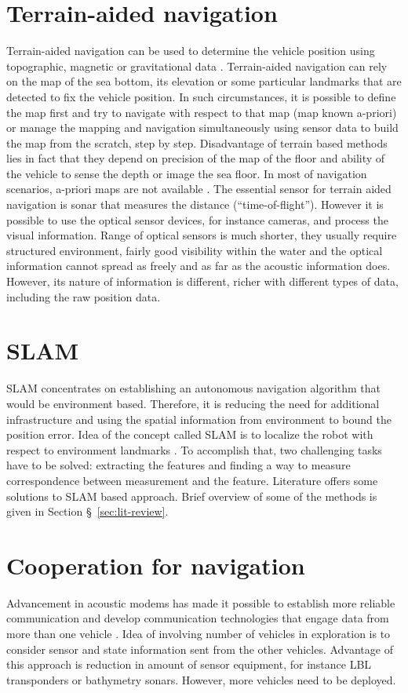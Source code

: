 \section{Terrain-aided navigation} \label{sec:terrain-aided}
Terrain-aided navigation can be used to determine the vehicle position using topographic, magnetic or gravitational data \cite{kinsey06}. Terrain-aided navigation can rely on the map of the sea bottom, its elevation or some particular landmarks that are detected to fix the vehicle position. In such circumstances, it is possible to define the map first and try to navigate with respect to that map (map known a-priori) or manage the mapping and navigation simultaneously using sensor data to build the map from the scratch, step by step. Disadvantage of terrain based methods lies in fact that they depend on precision of the map of the floor and ability of the vehicle to sense the depth or image the sea floor. In most of navigation scenarios, a-priori maps are not available \cite{kinsey06}.
The essential sensor for terrain aided navigation is sonar that measures the distance (``time-of-flight''). However it is possible to use the optical sensor devices, for instance cameras, and process the visual information. Range of optical sensors is much shorter, they usually require structured environment, fairly good visibility within the water and the optical information cannot spread as freely and as far as the acoustic information does. However, its nature of information is different, richer with different types of data, including the raw position data. 
\section{SLAM} \label{sec:slam}
SLAM concentrates on establishing an autonomous navigation algorithm that would be environment based. Therefore, it is reducing the need for additional infrastructure and using the spatial information from environment to bound the position error. Idea of the concept called SLAM is to localize the robot with respect to environment landmarks \cite{ruiz01}. To accomplish that, two challenging tasks have to be solved: extracting the features and finding a way to measure correspondence between measurement and the feature. Literature offers some solutions to SLAM based approach. Brief overview of some of the methods is given in Section \S~\ref{sec:lit-review}. 
\section{Cooperation for navigation} \label{sec:cooperation}
Advancement in acoustic modems has made it possible to establish more reliable communication and develop communication technologies that engage data from more than one vehicle \cite{bahr08, fallon10}. Idea of involving number of vehicles in exploration is to consider sensor and state information sent from the other vehicles. Advantage of this approach is reduction in amount of sensor equipment, for instance LBL transponders or bathymetry sonars. However, more vehicles need to be deployed. 
